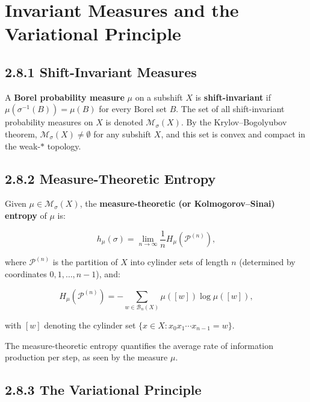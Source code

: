 \section{Invariant Measures and the Variational Principle}

\subsection{2.8.1 Shift-Invariant Measures}

A \textbf{Borel probability measure} $\mu$ on a subshift $X$ is \textbf{shift-invariant} if $\mu(\sigma^{-1}(B)) = \mu(B)$ for every Borel set $B$. The set of all shift-invariant probability measures on $X$ is denoted $\mathcal{M}_\sigma(X)$. By the Krylov--Bogolyubov theorem, $\mathcal{M}_\sigma(X) \neq \emptyset$ for any subshift $X$, and this set is convex and compact in the weak-$*$ topology.

\subsection{2.8.2 Measure-Theoretic Entropy}

\begin{definition}
Given $\mu \in \mathcal{M}_\sigma(X)$, the \textbf{measure-theoretic (or Kolmogorov--Sinai) entropy} of $\mu$ is:

\[h_\mu(\sigma) = \lim_{n \to \infty} \frac{1}{n} H_\mu(\mathcal{P}^{(n)}),\]

where $\mathcal{P}^{(n)}$ is the partition of $X$ into cylinder sets of length $n$ (determined by coordinates $0, 1, \ldots, n-1$), and:

\[H_\mu(\mathcal{P}^{(n)}) = -\sum_{w \in \mathcal{B}_n(X)} \mu([w]) \log \mu([w]),\]

with $[w]$ denoting the cylinder set $\{ x \in X : x_0 x_1 \cdots x_{n-1} = w\} $.

The measure-theoretic entropy quantifies the average rate of information production per step, as seen by the measure $\mu$.
\end{definition}

\subsection{2.8.3 The Variational Principle}

